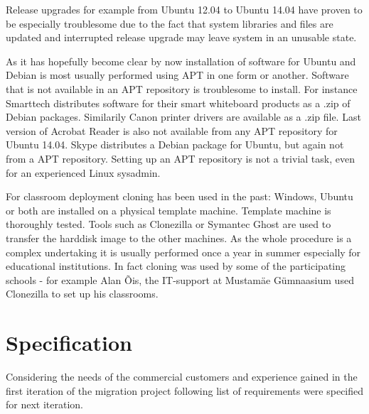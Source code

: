 \documentclass[a4paper,11pt]{kth-mag}
\begin{document}
Release upgrades for example from Ubuntu 12.04 to Ubuntu 14.04
have proven to be especially troublesome due to the fact that system libraries
and files are updated and interrupted release upgrade may leave system
in an unusable state.

As it has hopefully become clear by now
installation of software for Ubuntu and Debian
is most usually performed using APT in one form or another.
Software that is not available in an APT repository
is troublesome to install.
For instance Smarttech distributes software for their smart
whiteboard products as a .zip of Debian packages.
Similarily Canon printer drivers are available as a .zip file.
Last version of Acrobat Reader is also not available
from any APT repository for Ubuntu 14.04.
Skype distributes a Debian package for Ubuntu, but again
not from a APT repository.
Setting up an APT repository is not a trivial task,
even for an experienced Linux sysadmin.


For classroom deployment cloning has been used in the past:
Windows, Ubuntu or both are installed on a physical template machine.
Template machine is thoroughly tested.
Tools such as Clonezilla or Symantec Ghost are used to transfer the
harddisk image to the other machines.
As the whole procedure is a complex undertaking
it is usually performed once a year in summer especially for
educational institutions.
In fact cloning was used by some of the participating
schools - for example Alan Õis, the IT-support at Mustamäe Gümnaasium
used Clonezilla to set up his classrooms.





\clearpage

\section{Specification}

Considering the needs of the commercial customers and
experience gained in the first iteration of the migration project
following list of requirements were specified for next iteration.
\end{document}
